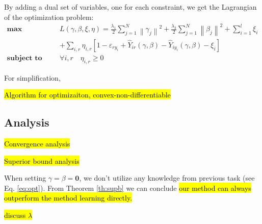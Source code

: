 By adding a dual set of variables, one for each constraint, we get the Lagrangian of the optimization problem:
\begin{equation}\label{eq:dual}
\begin{aligned}
 \textbf{max}\qquad {}& L\left( {\gamma ,\beta ,\xi ,\eta } \right) =\frac{{{\lambda _1}}}{2}\sum\limits_{j = 1}^N {{{\left\| {{\gamma _j}} \right\|}^2}}  + \frac{{{\lambda _2}}}{2}\sum\limits_{j = 1}^N {{{\left\| {{\beta _j}} \right\|}^2}}  + \sum\limits_{i = 1}^l {{\xi _i}} \\
   &+ \sum\limits_{i,r} {{\eta _{i,r}}\left[ {1 - {\varepsilon _{r{y_i}}} + {{\hat Y}_{ir}}\left( {\gamma ,\beta } \right) - {{\hat Y}_{i{y_i}}}\left( {\gamma ,\beta } \right) - {\xi _i}} \right]}  \\
 \textbf{subject to} \qquad {} & \forall i,r \quad {} {\eta _{i,r}} \ge 0
\end{aligned}
\end{equation}

For simplification, 

\hl{Algorithm for optimizaiton, convex-non-differentiable}


\subsection{Analysis}
\hl{Convergence analysis}

\hl{Superior bound analysis}


When setting $\gamma=\beta = \mathbf{0}$, we don't utilize any knowledge from previous task (see Eq. \eqref{eq:opt}). From Theorem \ref{th:supb} we can conclude \hl{our method can always outperform the method learning directly.}

\hl{discuss $\lambda$}
